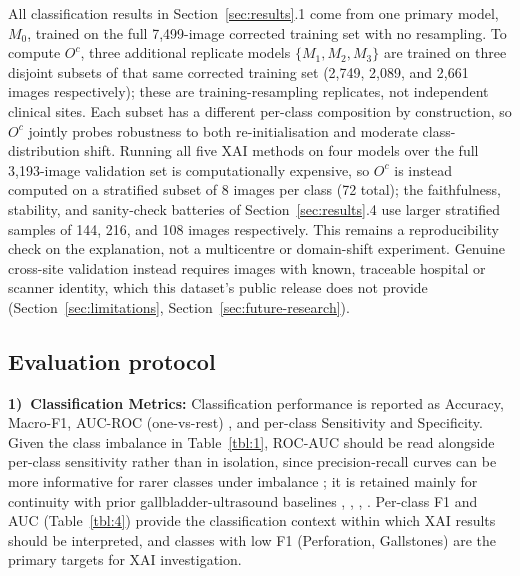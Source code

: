 All classification results in Section~\ref{sec:results}.1 come from one primary model, $M_0$, trained on the full 7,499-image corrected training set with no resampling. To compute $O^c$, three additional replicate models $\{M_1,M_2,M_3\}$ are trained on three disjoint subsets of that same corrected training set (2,749, 2,089, and 2,661 images respectively); these are training-resampling replicates, not independent clinical sites. Each subset has a different per-class composition by construction, so $O^c$ jointly probes robustness to both re-initialisation and moderate class-distribution shift. Running all five XAI methods on four models over the full 3,193-image validation set is computationally expensive, so $O^c$ is instead computed on a stratified subset of 8 images per class (72 total); the faithfulness, stability, and sanity-check batteries of Section~\ref{sec:results}.4 use larger stratified samples of 144, 216, and 108 images respectively. This remains a reproducibility check on the explanation, not a multicentre or domain-shift experiment. Genuine cross-site validation instead requires images with known, traceable hospital or scanner identity, which this dataset's public release does not provide (Section~\ref{sec:limitations}, Section~\ref{sec:future-research}).

\subsection{Evaluation protocol}

\textbf{1)~Classification Metrics:} Classification performance is reported as Accuracy, Macro-F1, AUC-ROC (one-vs-rest) \cite{ref45}, and per-class Sensitivity and Specificity. Given the class imbalance in Table~\ref{tbl:1}, ROC-AUC should be read alongside per-class sensitivity rather than in isolation, since precision-recall curves can be more informative for rarer classes under imbalance \cite{ref46}; it is retained mainly for continuity with prior gallbladder-ultrasound baselines \cite{ref7}, \cite{ref19}, \cite{ref20}, \cite{ref21}. Per-class F1 and AUC (Table~\ref{tbl:4}) provide the classification context within which XAI results should be interpreted, and classes with low F1 (Perforation, Gallstones) are the primary targets for XAI investigation.

